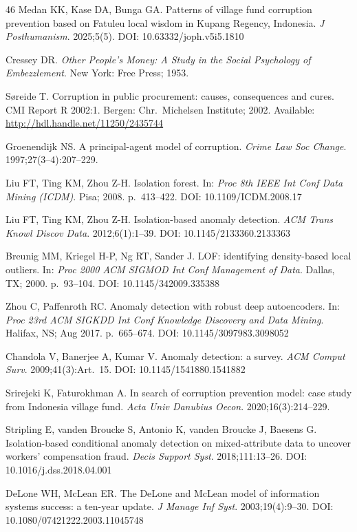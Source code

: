 \documentclass[3p,times,procedia]{elsarticle}
\begin{document}
\begin{thebibliography}{46}
Medan KK, Kase DA, Bunga GA. Patterns of village fund corruption prevention based on Fatuleu local wisdom in Kupang Regency, Indonesia. \textit{J Posthumanism}. 2025;5(5). DOI: 10.63332/joph.v5i5.1810

Cressey DR. \textit{Other People's Money: A Study in the Social Psychology of Embezzlement}. New York: Free Press; 1953.

S{\o}reide T. Corruption in public procurement: causes, consequences and cures. CMI Report R 2002:1. Bergen: Chr.\ Michelsen Institute; 2002. Available: \url{http://hdl.handle.net/11250/2435744}

Groenendijk NS. A principal-agent model of corruption. \textit{Crime Law Soc Change}. 1997;27(3--4):207--229.

Liu FT, Ting KM, Zhou Z-H. Isolation forest. In: \textit{Proc 8th IEEE Int Conf Data Mining (ICDM)}. Pisa; 2008. p.\ 413--422. DOI: 10.1109/ICDM.2008.17

Liu FT, Ting KM, Zhou Z-H. Isolation-based anomaly detection. \textit{ACM Trans Knowl Discov Data}. 2012;6(1):1--39. DOI: 10.1145/2133360.2133363

Breunig MM, Kriegel H-P, Ng RT, Sander J. LOF: identifying density-based local outliers. In: \textit{Proc 2000 ACM SIGMOD Int Conf Management of Data}. Dallas, TX; 2000. p.\ 93--104. DOI: 10.1145/342009.335388

Zhou C, Paffenroth RC. Anomaly detection with robust deep autoencoders. In: \textit{Proc 23rd ACM SIGKDD Int Conf Knowledge Discovery and Data Mining}. Halifax, NS; Aug 2017. p.\ 665--674. DOI: 10.1145/3097983.3098052

Chandola V, Banerjee A, Kumar V. Anomaly detection: a survey. \textit{ACM Comput Surv}. 2009;41(3):Art.~15. DOI: 10.1145/1541880.1541882

Srirejeki K, Faturokhman A. In search of corruption prevention model: case study from Indonesia village fund. \textit{Acta Univ Danubius Oecon}. 2020;16(3):214--229.

Stripling E, vanden Broucke S, Antonio K, vanden Broucke J, Baesens G. Isolation-based conditional anomaly detection on mixed-attribute data to uncover workers' compensation fraud. \textit{Decis Support Syst}. 2018;111:13--26. DOI: 10.1016/j.dss.2018.04.001

DeLone WH, McLean ER. The DeLone and McLean model of information systems success: a ten-year update. \textit{J Manage Inf Syst}. 2003;19(4):9--30. DOI: 10.1080/07421222.2003.11045748

\end{thebibliography}
\end{document}
